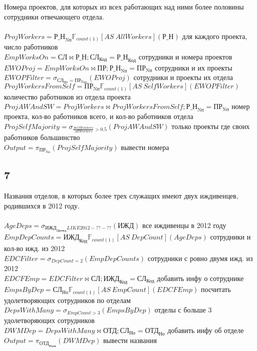 \documentclass[12pt]{article}
\newcommand{\employee}{\textbf{СЛ}}
\newcommand{\department}{\textbf{ОТД}}
\newcommand{\project}{\textbf{ПР}}
\newcommand{\dependant}{\textbf{ИЖД}}
\newcommand{\workson}{\textbf{Р\_Н}}
\newcommand{\employeeId}{\textbf{СЛ}_\text{Код}}
\newcommand{\employeeDepId}{\textbf{СЛ}_\text{Но}}
\newcommand{\departmentName}{\textbf{ОТД}_\text{Назв}}
\newcommand{\departmentId}{\textbf{ОТД}_\text{Но}}
\newcommand{\projectId}{\textbf{ПР}_\text{Nп}}
\newcommand{\projectResponsibleDepId}{\textbf{ПР}_\text{Nоо}}
\newcommand{\dependantEmpId}{\textbf{ИЖД}_\text{Код}}
\newcommand{\dependantBday}{\textbf{ИЖД}_\text{Дрожд}}
\newcommand{\worksonEmpId}{\textbf{Р\_Н}_\text{Код}}
\newcommand{\worksonProjId}{\textbf{Р\_Н}_\text{Nп}}
\newcommand{\filter}[2]{\sigma{}_{#1} \allowbreak \left( #2 \right)}
\newcommand{\join}[3]{ #1 \bowtie #2;\allowbreak #3 }
\newcommand{\select}[2]{\pi_{#1} \allowbreak \left( #2 \right)}
\newcommand{\aggregate}[4]{  #1 \mathbb{F}_{#2} \left[AS\ #3 \right] \left( #4 \right)  }
\begin{document}
Номера проектов, для которых из всех работающих над ними более половины сотрудники отвечающего отдела.\\\\
    $ProjWorkers = \aggregate{\worksonProjId}{count(1)}{AllWorkers}{\workson}$ 
 для каждого проекта, число работников \\ 
    $ EmpWorksOn = \join{\employee}{\workson}{\employeeId = \worksonEmpId}$ 
 сотрудники и номера проектов \\ 
    $ EWOProj = \join{EmpWorksOn}{\project}{\worksonProjId = \projectId}$ 
 сотрудники и их проекты \\ 
    $ EWOPFilter = \filter{\employeeDepId = \projectResponsibleDepId}{EWOProj}$ 
 сотрудники и проекты их отдела \\ 
    $ ProjWorkersFromSelf = \aggregate{\projectId}{count(1)}{SelfWorkers}{EWOPFilter}$ 
 количество работников из отдела проекта \\ 
    $ ProjAWAndSW = \join{ProjWorkers}{ProjWorkersFromSelf}{\worksonProjId = \projectId}$ 
 номер проекта, кол-во работников всего, и кол-во работников отдела \\ 
    $ ProjSelfMajority = \filter{\frac{SelfWorkers}{AllWorkers} > 0.5}{ProjAWAndSW} $ 
 только проекты где своих работников большинство \\ 
    $ Output = \select{\projectId}{ProjSelfMajority}$ 
 вывести номера \\ 

\subsection{7}

Названия отделов, в которых более трех служащих имеют двух иждивенцев, родившихся в 2012 году.\\\\
    $ AgeDeps = \filter{\dependantBday LIKE 2012-??-??}{\dependant}$ 
 все иждивенцы в 2012 году \\ 
    $ EmpDepCounts = \aggregate{\dependantEmpId}{count(1)}{DepCount}{AgeDeps}$ 
 сотрудники и кол-во ижд. из 2012 \\ 
    $ EDCFilter = \filter{DepCount = 2}{EmpDepCounts}$ 
 сотрудники с ровно двумя ижд. из 2012 \\ 
    $ EDCFEmp = \join{EDCFilter}{\employee}{\dependantEmpId = \employeeId}$ 
 добавить инфу о сотруднике \\ 
    $ EmpsByDep = \aggregate{\employeeDepId}{count(1)}{EmpCount}{EDCFEmp}$ 
 посчитать удолетворяющих сотрудников по отделам \\ 
    $ DepsWithMany = \filter{EmpCount>3}{EmpsByDep}$ 
 отделы с больше 3 удолетворяющих сотрудников \\ 
    $ DWMDep = \join{DepsWithMany}{\department}{\employeeDepId = \departmentId}$ 
 добавить инфу об отделе \\ 
    $ Output = \select{\departmentName}{DWMDep}$ 
 вывести названия \\ 
\end{document}
